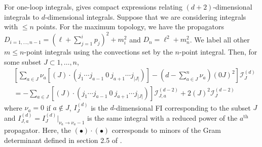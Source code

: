 \documentclass[11pt]{article}
\newcommand{\nn}{\nonumber}
\begin{document}
For one-loop integrals, \cite{Tarasov_1996} gives compact expressions relating $(d+2)$-dimensional integrals to $d$-dimensional integrals. Suppose that we are considering integrals with $\leq n$ points. For the maximum topology, we have the propagators $D_{i=1,\dots,n-1} = (\ell + \sum_{j=1}^i p_j)^2 + m_i^2$ and $D_n = \ell^2 + m_n^2$. We label all other $m \leq n$-point integrals using the convections set by the $n$-point integral. Then, for some subset $J \subset {1,\dots,n}$,  
\begin{align} \label{eq:tarasov}
	& \left[
		\sum_{a \in J} \nu_a [(J) \cdot (j_1 \cdots j_{a-1}\ 0\ j_{a+1} \cdots j_{|J|})]
		- \left(d - \sum_{a \in J}^n \nu_a \right) (0J)^2 
	\right] \mathscr{I}_J^{(d)} 
	\nn \\
	&= - \sum_{a\in J} [(J) \cdot (j_1 \cdots j_{a-1}\ 0\ j_{a+1} \cdots j_{|J|})] \mathscr{I}_{J,a}^{(d-2)}
	+ 2 (J)^2 \mathscr{I}_J^{(d-2)}
\end{align}
where $\nu_a = 0$ if $a \notin J$, $I_{J}^{(d)}$ is the $d$-dimensional FI corresponding to the subset $J$ and $I_{J,a}^{(d)} = I_{J}^{(d)}\vert_{\nu_a\to\nu_a-1}$ is the same integral with a reduced power of the $a^\text{th}$ propagator. Here, the $(\bullet)\cdot(\bullet)$ corresponds to minors of the Gram determinant defined in section 2.5  of \cite{Caron-Huot:2021xqj}.
\end{document}
